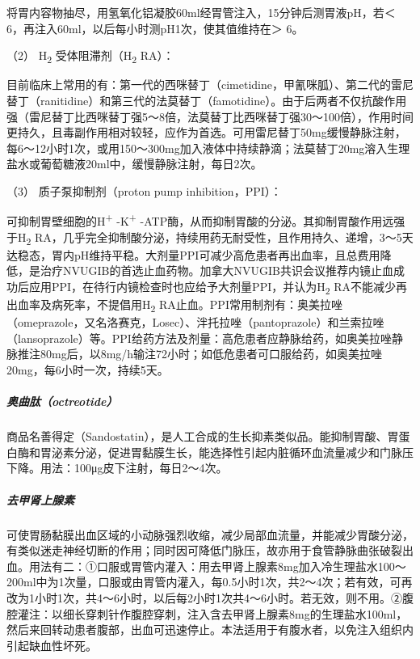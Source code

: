 将胃内容物抽尽，用氢氧化铝凝胶60ml经胃管注入，15分钟后测胃液pH，若＜
6，再注入60ml，以后每小时测pH1次，使其值维持在＞ 6。

\hypertarget{text00032.htmlux5cux23CHP1-13-1-5-3-2-2}{}
（2） H\textsubscript{2} 受体阻滞剂（H\textsubscript{2} RA）：

目前临床上常用的有：第一代的西咪替丁（cimetidine，甲氰咪胍）、第二代的雷尼替丁（ranitidine）和第三代的法莫替丁（famotidine）。由于后两者不仅抗酸作用强（雷尼替丁比西咪替丁强5～8倍，法莫替丁比西咪替丁强30～100倍），作用时间更持久，且毒副作用相对较轻，应作为首选。可用雷尼替丁50mg缓慢静脉注射，每6～12小时1次，或用150～300mg加入液体中持续静滴；法莫替丁20mg溶入生理盐水或葡萄糖液20ml中，缓慢静脉注射，每日2次。

\hypertarget{text00032.htmlux5cux23CHP1-13-1-5-3-2-3}{}
（3） 质子泵抑制剂（proton pump inhibition，PPI）：

可抑制胃壁细胞的H\textsuperscript{+} -K\textsuperscript{+}
-ATP酶，从而抑制胃酸的分泌。其抑制胃酸作用远强于H\textsubscript{2}
RA，几乎完全抑制酸分泌，持续用药无耐受性，且作用持久、递增，3～5天达稳态，胃内pH维持平稳。大剂量PPI可减少高危患者再出血率，且总费用降低，是治疗NVUGIB的首选止血药物。加拿大NVUGIB共识会议推荐内镜止血成功后应用PPI，在待行内镜检查时也应给予大剂量PPI，并认为H\textsubscript{2}
RA不能减少再出血率及病死率，不提倡用H\textsubscript{2}
RA止血。PPI常用制剂有：奥美拉唑（omeprazole，又名洛赛克，Losec）、泮托拉唑（pantoprazole）和兰索拉唑（lansoprazole）等。PPI给药方法及剂量：高危患者应静脉给药，如奥美拉唑静脉推注80mg后，以8mg/h输注72小时；如低危患者可口服给药，如奥美拉唑20mg，每6小时一次，持续5天。

\subparagraph{奥曲肽（octreotide）}

商品名善得定（Sandostatin），是人工合成的生长抑素类似品。能抑制胃酸、胃蛋白酶和胃泌素分泌，促进胃黏膜生长，能选择性引起内脏循环血流量减少和门脉压下降。用法：100μg皮下注射，每日2～4次。

\subparagraph{去甲肾上腺素}

可使胃肠黏膜出血区域的小动脉强烈收缩，减少局部血流量，并能减少胃酸分泌，有类似迷走神经切断的作用；同时因可降低门脉压，故亦用于食管静脉曲张破裂出血。用法有二：①口服或胃管内灌入：用去甲肾上腺素8mg加入冷生理盐水100～200ml中为1次量，口服或由胃管内灌入，每0.5小时1次，共2～4次；若有效，可再改为1小时1次，共4～6小时，以后每2小时1次共4～6小时。若无效，则不用。②腹腔灌注：以细长穿刺针作腹腔穿刺，注入含去甲肾上腺素8mg的生理盐水100ml，然后来回转动患者腹部，出血可迅速停止。本法适用于有腹水者，以免注入组织内引起缺血性坏死。

